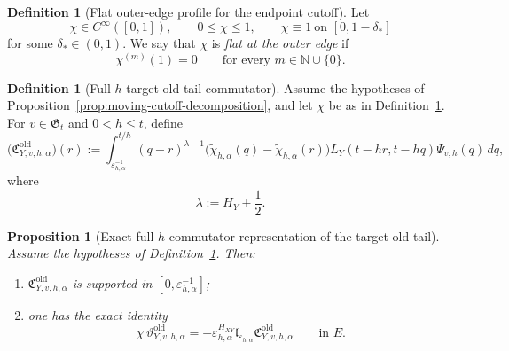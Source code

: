 \documentclass[11pt,a4paper]{amsart}
\theoremstyle{plain}
\newtheorem{proposition}[theorem]{Proposition}
\theoremstyle{definition}
\newtheorem{definition}[theorem]{Definition}
\theoremstyle{remark}
\begin{document}
\begin{definition}[Flat outer-edge profile for the endpoint cutoff]
\label{def:endpoint-flat-cutoff}
Let
\[
\chi\in C^\infty([0,1]),
\qquad
0\le \chi\le1,
\qquad
\chi\equiv1\ \text{on }[0,1-\delta_*]
\]
for some \(\delta_*\in(0,1)\). We say that \(\chi\) is \emph{flat at the outer edge} if
\[
\chi^{(m)}(1)=0
\qquad\text{for every }m\in\mathbb N\cup\{0\}.
\]
\end{definition}

\begin{definition}[Full-\(h\) target old-tail commutator]
\label{def:full-h-target-old-tail}
Assume the hypotheses of Proposition~\ref{prop:moving-cutoff-decomposition}, and let \(\chi\) be as
in Definition~\ref{def:endpoint-flat-cutoff}. For \(v\in\mathfrak G_t\) and \(0<h\le t\), define
\begin{equation}\label{eq:full-h-target-old-tail}
\bigl(
\mathfrak C_{Y,v,h,\alpha}^{\mathrm{old}}
\bigr)(r)
:=
\int_{\varepsilon_{h,\alpha}^{-1}}^{t/h}
(q-r)^{\lambda-1}
\bigl(
\widetilde\chi_{h,\alpha}(q)-\widetilde\chi_{h,\alpha}(r)
\bigr)
L_Y(t-hr,t-hq)\Psi_{v,h}(q)\,dq,
\end{equation}
where
\[
\lambda:=H_Y+\frac12.
\]
\end{definition}

\begin{proposition}[Exact full-\(h\) commutator representation of the target old tail]
\label{prop:full-h-target-old-tail}
Assume the hypotheses of Definition~\ref{def:full-h-target-old-tail}. Then:
\begin{enumerate}[label=(\roman*)]
\item \(\mathfrak C_{Y,v,h,\alpha}^{\mathrm{old}}\) is supported in
\([0,\varepsilon_{h,\alpha}^{-1}]\);
\item one has the exact identity
\begin{equation}\label{eq:full-h-target-old-tail-id}
\chi\,\vartheta_{Y,v,h,\alpha}^{\mathrm{old}}
=
-\varepsilon_{h,\alpha}^{H_{XY}}
\mathfrak l_{\varepsilon_{h,\alpha}}
\mathfrak C_{Y,v,h,\alpha}^{\mathrm{old}}
\qquad\text{in }E.
\end{equation}
\end{enumerate}
\end{proposition}
\end{document}
